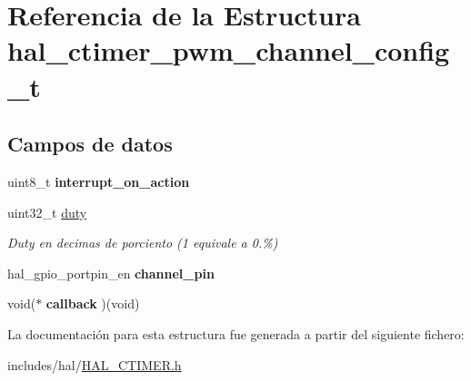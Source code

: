\hypertarget{structhal__ctimer__pwm__channel__config__t}{}\section{Referencia de la Estructura hal\+\_\+ctimer\+\_\+pwm\+\_\+channel\+\_\+config\+\_\+t}
\label{structhal__ctimer__pwm__channel__config__t}
\subsection*{Campos de datos}
\begin{DoxyCompactItemize}
\item 
\mbox{\label{structhal__ctimer__pwm__channel__config__t_a96f53282255ed9752bad0f65b6e142cd}} 
uint8\+\_\+t {\bfseries interrupt\+\_\+on\+\_\+action}
\item 
\mbox{\label{structhal__ctimer__pwm__channel__config__t_ae75b5c2a27714f2e4f77a8199db87e52}} 
uint32\+\_\+t \hyperlink{structhal__ctimer__pwm__channel__config__t_ae75b5c2a27714f2e4f77a8199db87e52}{duty}
\begin{DoxyCompactList}\small\item\em Duty en decimas de porciento (1 equivale a 0.\%) \end{DoxyCompactList}\item 
\mbox{\label{structhal__ctimer__pwm__channel__config__t_af6577eb92a91917422e4a55361a32803}} 
hal\+\_\+gpio\+\_\+portpin\+\_\+en {\bfseries channel\+\_\+pin}
\item 
\mbox{\label{structhal__ctimer__pwm__channel__config__t_aa9712ca98872c1700d38f58d74cecfcb}} 
void($\ast$ {\bfseries callback} )(void)
\end{DoxyCompactItemize}


La documentación para esta estructura fue generada a partir del siguiente fichero\+:\begin{DoxyCompactItemize}
\item 
includes/hal/\hyperlink{HAL__CTIMER_8h}{H\+A\+L\+\_\+\+C\+T\+I\+M\+E\+R.\+h}\end{DoxyCompactItemize}
